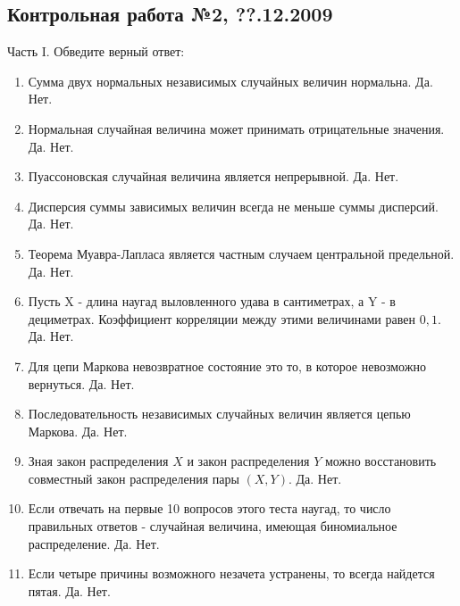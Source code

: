 \documentclass[12pt, a4paper]{article}\usepackage[]{graphicx}\usepackage[]{color}
\begin{document}
\subsection{Контрольная работа №2, ??.12.2009}

Часть I. Обведите верный ответ:
\begin{enumerate}
\item Сумма двух нормальных независимых случайных величин нормальна. Да. Нет.

\item Нормальная случайная величина может принимать отрицательные значения. Да. Нет.

\item Пуассоновская случайная величина является непрерывной. Да. Нет.

\item Дисперсия суммы зависимых величин всегда не меньше суммы дисперсий. Да. Нет.

\item Теорема Муавра-Лапласа является частным случаем центральной предельной. Да. Нет.

\item Пусть X - длина наугад выловленного удава в сантиметрах, а Y - в дециметрах. Коэффициент корреляции между этими величинами равен $0,1$. Да. Нет.

\item Для цепи Маркова невозвратное состояние это то, в которое невозможно вернуться. Да. Нет.

\item Последовательность  независимых случайных величин является цепью Маркова. Да. Нет.

\item Зная закон распределения $X$ и закон распределения $Y$ можно восстановить совместный
закон распределения пары $(X,Y)$. Да. Нет.

\item Если отвечать на первые 10 вопросов этого теста наугад, то число правильных ответов - случайная величина, имеющая биномиальное распределение. Да. Нет.

\item Если четыре причины возможного незачета устранены, то всегда найдется пятая. Да. Нет.


\end{enumerate}
\end{document}
